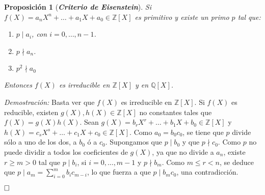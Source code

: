 \documentclass[12pt]{article}
\newtheorem{proposition}[theorem]{Proposición}
\begin{document}
\begin{proposition}[\textbf{\textit{Criterio de Eisenstein}}] Si $f(X) = a_nX^n+ \ldots + a_1X + a_0 \in \mathbb{Z}[X]$ es primitivo y existe un primo $p$ tal que: 
\begin{enumerate}
\item $p \mid a_i$, con $i = 0, \ldots, n-1$.
\item $p \nmid a_n$.
\item $p^2 \nmid a_0$
\end{enumerate}
Entonces $f(X)$ es irreducible en $\mathbb{Z}[X]$ y en $\mathbb{Q}[X]$.
\end{proposition}
\emph{Demostración: }Basta ver que $f(X)$ es irreducible en $\mathbb{Z}[X]$. Si $f(X)$ es reducible, existen $g(X), h(X) \in \mathbb{Z}[X]$ no constantes tales que $f(X) = g(X)h(X)$. Sean $g(X) = b_rX^r+ \ldots + b_1X + b_0 \in \mathbb{Z}[X]$ y $h(X)= c_sX^s+ \ldots + c_1 X + c_0 \in \mathbb{Z}[X]$. Como $a_0 = b_0c_0$, se tiene que $p$ divide sólo a uno de los dos, a $b_0$ ó a $c_0$. Supongamos que $p \mid b_0$ y que $p \nmid c_0$. Como $p$ no puede dividir a todos los coeficientes de $g(X)$, ya que no divide a $a_n$, existe $r \geq m >0$ tal que $p \mid b_i$, si $i = 0, \ldots, m-1$ y $p \nmid b_m$. Como $m \leq r < n$, se deduce que $p \mid a_m = \sum_{i=0}^m b_ic_{m-i}$, lo que fuerza a que $p \mid b_mc_0$, una contradicción.

$\hfill \square$
\end{document}
